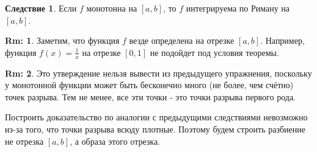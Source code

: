 \documentclass[12pt]{article}
\theoremstyle{definition}
\newtheorem{rem}{Rm:}
\newtheorem{corollary}{Следствие}
\begin{document}
\begin{corollary}
	Если $f$ монотонна на $[a,b]$, то $f$ интегрируема по Риману на $[a,b]$.
\end{corollary}
\begin{rem}
	Заметим, что функция $f$ везде определена на отрезке $[a,b]$. Например, функция $f(x) = \tfrac{1}{x}$ на отрезке $[0,1]$ не подойдет под условия теоремы.
\end{rem}
\begin{rem}	
	Это утверждение нельзя вывести из предыдущего упражнения, поскольку у монотонной функции может быть бесконечно много (не более, чем счётно) точек разрыва. Тем не менее, все эти точки - это точки разрыва первого рода.
\end{rem}
Построить доказательство по аналогии с предыдущими следствиями невозможно из-за того, что точки разрыва всюду плотные. Поэтому будем строить разбиение не отрезка $[a,b]$, а образа этого отрезка.
\end{document}
